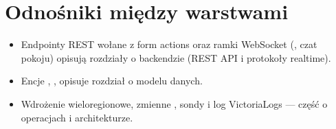 \section{Odnośniki między warstwami}\label{sec:fe-odnosniki}

\begin{itemize}[nosep]
  \item Endpointy REST wołane z form actions oraz ramki WebSocket (, czat pokoju) opisują
        rozdziały o backendzie (REST API i protokoły realtime).
  \item Encje , ,  opisuje rozdział o modelu danych.
  \item Wdrożenie wieloregionowe, zmienne , sondy  i log VictoriaLogs ---
        część o operacjach i architekturze.
\end{itemize}

